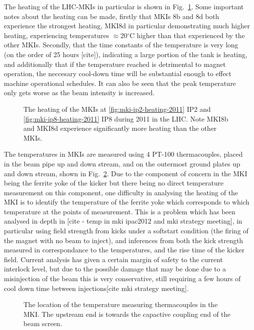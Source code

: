 The heating of the LHC-MKIs in particular is shown in Fig.~\ref{fig:mki-heating-2011}. Some important notes about the heating can be made, firstly that MKIs 8b and 8d both experience the strongest heating, MKI8d in particular demonstrating much higher heating, experiencing temperatures $\approx$20$^{\circ}$C higher than that experienced by the other MKIs. Secondly, that the time constants of the temperature is very long (on the order of 25 hours [cite]), indicating a large portion of the tank is heating, and additionally that if the temperature reached is detrimental to magnet operation, the neccesary cool-down time will be substantial enough to effect machine operational schedules. It can also be seen that the peak temperature only gets worse as the beam intensity is increased.

\begin{figure}
\subfigure[]{
\label{fig:mki-ip2-heating-2011}
}
\subfigure[]{
\label{fig:mki-ip8-heating-2011}
}
\label{fig:mki-heating-2011}
\caption{The heating of the MKIs at \ref{fig:mki-ip2-heating-2011} IP2 and \ref{fig:mki-ip8-heating-2011} IP8 during 2011 in the LHC. Note MKI8b and MKI8d experience significantly more heating than the other MKIs.}
\end{figure}

The temperatures in MKIs are measured using 4 PT-100 thermacouples, placed in the beam pipe up and down stream, and on the outermost ground plates up and down stream, shown in Fig.~\ref{fig:mki-thermacouple-location}. Due to the component of concern in the MKI being the ferrite yoke of the kicker but there being no direct temperature measurement on this component, one difficulty in analysing the heating of the MKI is to identify the temperature of the ferrite yoke which corresponds to which temperature at the points of measurement. This is a problem which has been analysed in depth in [cite - temp in mki ipac2012 and mki strategy meeting], in particular using field strength from kicks under a softstart condition (the firing of the magnet with no beam to inject), and inferences from both the kick strength measured in correspondance to the temperatures, and the rise time of the kicker field. Current analysis has given a certain margin of safety to the current interlock level, but due to the possible damage that may be done due to a misinjection of the beam this is very conservative, still requiring a few hours of cool down time between injections[cite mki strategy meeting].

\begin{figure}
\label{fig:mki-thermacouple-location}
\caption{The location of the temperature measuring thermacouples in the MKI. The upstream end is towards the capactive coupling end of the beam screen.}
\end{figure}

